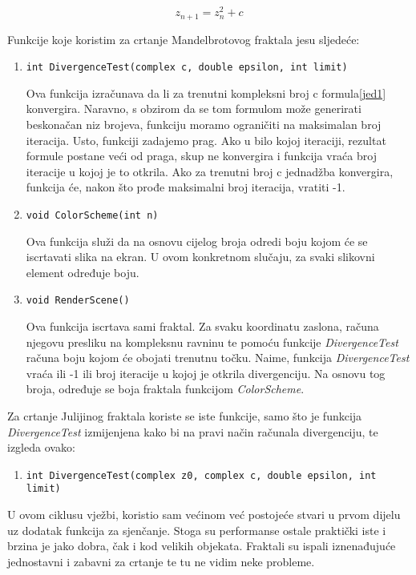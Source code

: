 \documentclass[utf8]{fer}
\begin{document}
\begin{equation} \label{jed1}
z_{n+1} = z_{n}^{2} + c
\end{equation}

Funkcije koje koristim za crtanje Mandelbrotovog fraktala jesu sljedeće:

\begin{enumerate}
\item \begin{lstlisting}
int DivergenceTest(complex c, double epsilon, int limit)
\end{lstlisting}

Ova funkcija izračunava da li za trenutni kompleksni broj c formula\ref{jed1} konvergira. Naravno, s obzirom da se tom formulom može generirati beskonačan niz brojeva, funkciju moramo ograničiti na maksimalan broj iteracija. Usto, funkciji zadajemo prag. Ako u bilo kojoj iteraciji, rezultat formule postane veći od praga, skup ne konvergira i funkcija vraća broj iteracije u kojoj je to otkrila. Ako za trenutni broj c jednadžba konvergira, funkcija će, nakon što prođe maksimalni broj iteracija, vratiti -1.

\item \begin{lstlisting}
void ColorScheme(int n)
\end{lstlisting}

Ova funkcija služi da na osnovu cijelog broja odredi boju kojom će se iscrtavati slika na ekran. U ovom konkretnom slučaju, za svaki slikovni element određuje boju.


\item \begin{lstlisting}
void RenderScene()
\end{lstlisting}

Ova funkcija iscrtava sami fraktal. Za svaku koordinatu zaslona, računa njegovu presliku na kompleksnu ravninu te pomoću funkcije \textit{DivergenceTest} računa boju kojom će obojati trenutnu točku. Naime, funkcija \textit{DivergenceTest} vraća ili -1 ili broj iteracije u kojoj je otkrila divergenciju. Na osnovu tog broja, određuje se boja fraktala funkcijom \textit{ColorScheme}.

\end{enumerate}

Za crtanje Julijinog fraktala koriste se iste funkcije, samo što je funkcija \textit{DivergenceTest} izmijenjena kako bi na pravi način računala divergenciju, te izgleda ovako:

\begin{enumerate}
\item \begin{lstlisting}
int DivergenceTest(complex z0, complex c, double epsilon, int limit)
\end{lstlisting}
\end{enumerate}

U ovom ciklusu vježbi, koristio sam većinom već postojeće stvari u prvom dijelu uz dodatak funkcija za sjenčanje. Stoga su performanse ostale praktički iste i brzina je jako dobra, čak i kod velikih objekata. Fraktali su ispali iznenađujuće jednostavni i zabavni za crtanje te tu ne vidim neke probleme.
\end{document}
